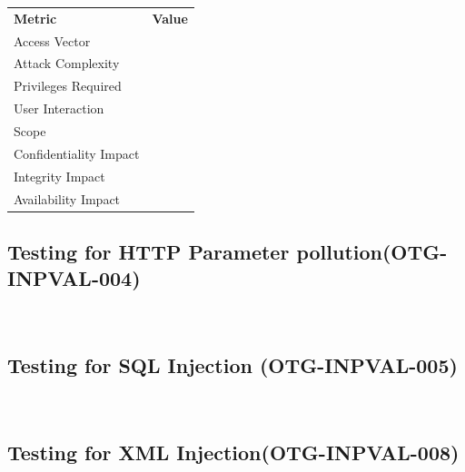 \documentclass[headsepline,footsepline,footinclude=false,oneside,fontsize=11pt,paper=a4,listof=totoc,bibliography=totoc]{scrbook} %
\begin{document}
\vspace{0.5cm} 
\begin{center}
	\begin{tabular}{ll}
		\rowcolor[HTML]{34CDF9} 
		{\color[HTML]{ECF4FF} \textbf{Metric}}        & {\color[HTML]{ECF4FF} \textbf{Value}} \\
		\rowcolor[HTML]{BBDAFF} 
		{\color[HTML]{333333} Access Vector}          & {\color[HTML]{333333} }               \\
		\rowcolor[HTML]{ECF4FF} 
		{\color[HTML]{333333} Attack Complexity}      & {\color[HTML]{333333} }               \\
		\rowcolor[HTML]{BBDAFF} 
		{\color[HTML]{333333} Privileges Required}    & {\color[HTML]{333333} }               \\
		\rowcolor[HTML]{ECF4FF} 
		{\color[HTML]{333333} User Interaction}       & {\color[HTML]{333333} }               \\
		\rowcolor[HTML]{BBDAFF} 
		{\color[HTML]{333333} Scope}                  & {\color[HTML]{333333} }               \\
		\rowcolor[HTML]{ECF4FF} 
		{\color[HTML]{333333} Confidentiality Impact} & {\color[HTML]{333333} }               \\
		\rowcolor[HTML]{BBDAFF} 
		{\color[HTML]{333333} Integrity Impact}       & {\color[HTML]{333333} }               \\
		\rowcolor[HTML]{ECF4FF} 
		{\color[HTML]{333333} Availability Impact}    & {\color[HTML]{333333} }              
	\end{tabular}
\end{center}


\pagebreak 
\subsection{Testing for HTTP Parameter pollution(OTG-INPVAL-004)}\
\pagebreak 
\subsection{Testing for SQL Injection  (OTG-INPVAL-005)}\
\pagebreak 
\subsection{Testing for XML Injection(OTG-INPVAL-008)}\
\pagebreak 
\end{document}
